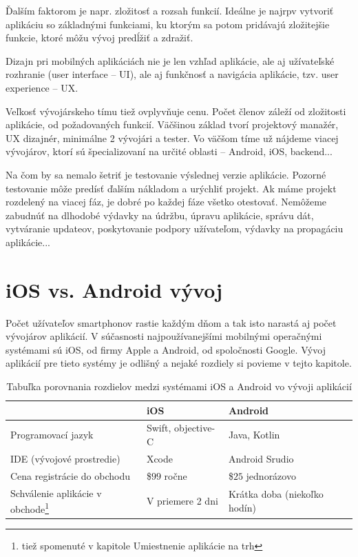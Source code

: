 \documentclass[10pt,twoside,slovak,a4paper]{article}
\begin{document}
Ďalším faktorom je napr. zložitosť a rozsah funkcií. Ideálne je najrpv vytvoriť aplikáciu so základnými funkciami, ku ktorým sa potom pridávajú zložitejšie funkcie, ktoré môžu vývoj predĺžiť a zdražiť.

Dizajn pri mobilných aplikáciách nie je len vzhľad aplikácie, ale aj užívateľské rozhranie (user interface – UI), ale aj funkčnosť a navigácia aplikácie, tzv. user experience – UX.

Veľkosť vývojárskeho tímu tiež ovplyvňuje cenu. Počet členov záleží od zložitosti aplikácie, od požadovaných funkcií. Väčšinou základ tvorí projektový manažér, UX dizajnér, minimálne 2 vývojári a tester. Vo väčšom tíme už nájdeme viacej vývojárov, ktorí sú špecializovaní na určité oblasti – Android, iOS, backend...

Na čom by sa nemalo šetriť je testovanie výslednej verzie aplikácie. Pozorné testovanie môže predísť ďalším nákladom a urýchliť projekt. Ak máme projekt rozdelený na viacej fáz, je dobré po každej fáze všetko otestovať.
Nemôžeme zabudnúť na dlhodobé výdavky na údržbu, úpravu aplikácie, správu dát, vytváranie updateov, poskytovanie podpory užívateľom, výdavky na propagáciu aplikácie...

\cite{pixelfield}



\section{iOS vs. Android vývoj}
\quad Počet užívateľov smartphonov  rastie každým dňom a tak isto narastá aj počet vývojárov aplikácií. V súčasnosti najpoužívanejšími mobilnými operačnými systémami sú iOS, od firmy Apple a Android, od spoločnosti Google. Vývoj aplikácií pre tieto systémy je odlišný a nejaké rozdiely si povieme v tejto kapitole.

\begin{savenotes}
\begin{table}[h!]
\begin{tabular}{|l|l|l|}
\hline
                               & iOS                & Android                      \\ \hline
Programovací jazyk             & Swift, objective-C & Java, Kotlin                 \\ \hline
IDE (vývojové prostredie)      & Xcode              & Android Srudio               \\ \hline
Cena registrácie do obchodu    & \$\begin{math}99\end{math} ročne         & \$\begin{math}25\end{math} jednorázovo             \\ \hline
Schválenie aplikácie v obchode\footnote{tiež spomenuté v kapitole Umiestnenie aplikácie na trh} & V priemere 2 dni   & Krátka doba (niekoľko hodín) \\ \hline
\end{tabular}
\caption{Tabuľka porovnania rozdielov medzi systémami iOS a Android vo vývoji aplikácií}
\end{table}
\end{savenotes}
\end{document}
